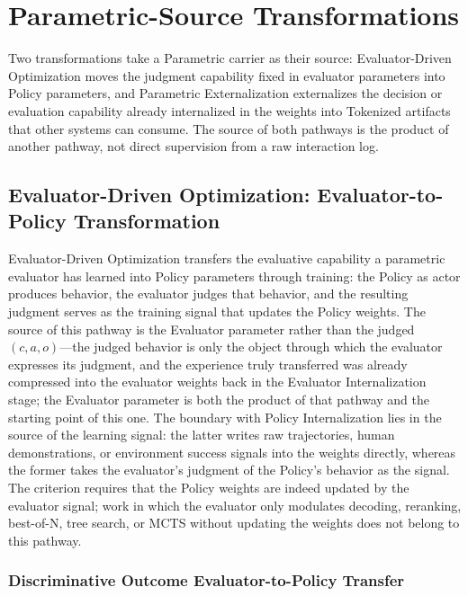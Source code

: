 \section{Parametric-Source Transformations}
\label{sec:param-source}

Two transformations take a Parametric carrier as their source: Evaluator-Driven Optimization moves the judgment capability fixed in evaluator parameters into Policy parameters, and Parametric Externalization externalizes the decision or evaluation capability already internalized in the weights into Tokenized artifacts that other systems can consume. The source of both pathways is the product of another pathway, not direct supervision from a raw interaction log.

\subsection{Evaluator-Driven Optimization: Evaluator-to-Policy Transformation}
\label{sec:evaluator-driven}

Evaluator-Driven Optimization transfers the evaluative capability a parametric evaluator has learned into Policy parameters through training: the Policy as actor produces behavior, the evaluator judges that behavior, and the resulting judgment serves as the training signal that updates the Policy weights. The source of this pathway is the Evaluator parameter rather than the judged $(c,a,o)$---the judged behavior is only the object through which the evaluator expresses its judgment, and the experience truly transferred was already compressed into the evaluator weights back in the Evaluator Internalization stage; the Evaluator parameter is both the product of that pathway and the starting point of this one. The boundary with Policy Internalization lies in the source of the learning signal: the latter writes raw trajectories, human demonstrations, or environment success signals into the weights directly, whereas the former takes the evaluator's judgment of the Policy's behavior as the signal. The criterion requires that the Policy weights are indeed updated by the evaluator signal; work in which the evaluator only modulates decoding, reranking, best-of-N, tree search, or MCTS without updating the weights does not belong to this pathway.

\subsubsection{Discriminative Outcome Evaluator-to-Policy Transfer}

